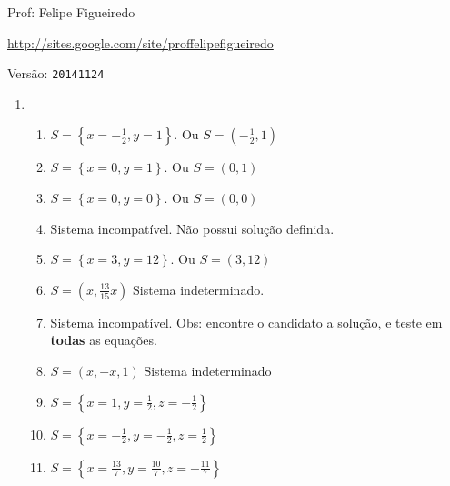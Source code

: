 \documentclass[a4paper]{article}
\begin{document}
\parbox[c]{.825\textwidth}{\raggedright%
{Prof: Felipe Figueiredo\par}
{\url{http://sites.google.com/site/proffelipefigueiredo}\par}
}

Versão: \verb|20141124|




\begin{enumerate}
\item 

  \begin{enumerate}
  \item $S=\left\{ x = -\frac{1}{2}, y = 1 \right\}$. Ou $S=(-\frac{1}{2},1)$
  \item $S=\left\{ x = 0, y = 1 \right\}$. Ou $S=(0,1)$
  \item $S=\left\{ x = 0, y = 0\right\}$. Ou $S=(0,0)$
  \item Sistema incompatível. Não possui solução definida.
  \item $S=\left\{ x = 3, y = 12 \right\}$. Ou $S=(3,12)$
  \item $S=(x, \frac{13}{15}x)$ Sistema indeterminado.
  \item Sistema incompatível. Obs: encontre o candidato a solução, e
    teste em {\bf todas} as equações.
  \item $S=(x,-x,1)$ Sistema indeterminado
  \item $S=\left\{ x = 1, y = \frac{1}{2}, z = -\frac{1}{2}\right\}$
  \item $S=\left\{ x = -\frac{1}{2}, y = - \frac{1}{2}, z = \frac{1}{2} \right\}$
  \item $S=\left\{ x = \frac{13}{7}, y = \frac{10}{7}, z = -\frac{11}{7} \right\}$

  \end{enumerate}
\end{enumerate}
\end{document}
